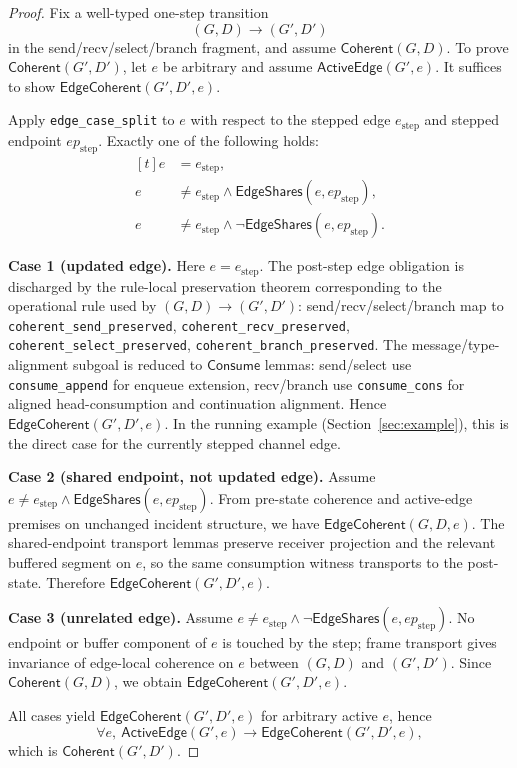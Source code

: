 \documentclass[a4paper,10pt,twocolumn,english]{article}
\numberwithin{equation}{section}
\theoremstyle{paperdef}
\theoremstyle{paperplain}
\theoremstyle{paperdef}
\theoremstyle{paperremark}
\newcommand{\Coherent}{\ensuremath{\mathsf{Coherent}}}
\newcommand{\EdgeCoherent}{\ensuremath{\mathsf{EdgeCoherent}}}
\newcommand{\ActiveEdge}{\ensuremath{\mathsf{ActiveEdge}}}
\newcommand{\Consume}{\ensuremath{\mathsf{Consume}}}
\newcommand{\EdgeShares}{\ensuremath{\mathsf{EdgeShares}}}
\begin{document}
\begin{proof}
	Fix a well-typed one-step transition
	\[
		(G,D)\to(G',D')
	\]
	in the send/recv/select/branch fragment, and assume $\Coherent(G,D)$.
	To prove $\Coherent(G',D')$, let $e$ be arbitrary and assume $\ActiveEdge(G',e)$.
	It suffices to show $\EdgeCoherent(G',D',e)$.

	Apply \nolinkurl{edge_case_split} to $e$ with respect to the stepped edge $e_{\mathrm{step}}$
	and stepped endpoint $ep_{\mathrm{step}}$. Exactly one of the following holds:
	\[
		\begin{aligned}[t]
			e & = e_{\mathrm{step}},                                               \\
			e & \neq e_{\mathrm{step}}\land \EdgeShares(e,ep_{\mathrm{step}}),     \\
			e & \neq e_{\mathrm{step}}\land \neg\EdgeShares(e,ep_{\mathrm{step}}).
		\end{aligned}
	\]

	\textbf{Case 1 (updated edge).}
	Here $e=e_{\mathrm{step}}$.
	The post-step edge obligation is discharged by the rule-local preservation theorem corresponding
	to the operational rule used by $(G,D)\to(G',D')$:
	send/recv/select/branch map to
	\nolinkurl{coherent_send_preserved},
	\nolinkurl{coherent_recv_preserved},
	\nolinkurl{coherent_select_preserved},
	\nolinkurl{coherent_branch_preserved}.
	The message/type-alignment subgoal is reduced to $\Consume$ lemmas:
	send/select use \nolinkurl{consume_append} for enqueue extension, recv/branch use
	\nolinkurl{consume_cons} for aligned head-consumption and continuation alignment.
	Hence $\EdgeCoherent(G',D',e)$.
	In the running example (Section~\ref{sec:example}), this is the direct case
	for the currently stepped channel edge.

	\textbf{Case 2 (shared endpoint, not updated edge).}
	Assume
	$e\neq e_{\mathrm{step}}\land \EdgeShares(e,ep_{\mathrm{step}})$.
	From pre-state coherence and active-edge premises on unchanged incident structure, we have
	$\EdgeCoherent(G,D,e)$. The shared-endpoint transport lemmas preserve receiver projection and the
	relevant buffered segment on $e$, so the same consumption witness transports to the post-state.
	Therefore $\EdgeCoherent(G',D',e)$.

	\textbf{Case 3 (unrelated edge).}
	Assume
	$e\neq e_{\mathrm{step}}\land \neg\EdgeShares(e,ep_{\mathrm{step}})$.
	No endpoint or buffer component of $e$ is touched by the step; frame transport gives
	invariance of edge-local coherence on $e$ between $(G,D)$ and $(G',D')$. Since
	$\Coherent(G,D)$, we obtain $\EdgeCoherent(G',D',e)$.

	All cases yield $\EdgeCoherent(G',D',e)$ for arbitrary active $e$, hence
	\[
		\forall e,\ \ActiveEdge(G',e)\to \EdgeCoherent(G',D',e),
	\]
	which is $\Coherent(G',D')$.
\end{proof}
\end{document}
